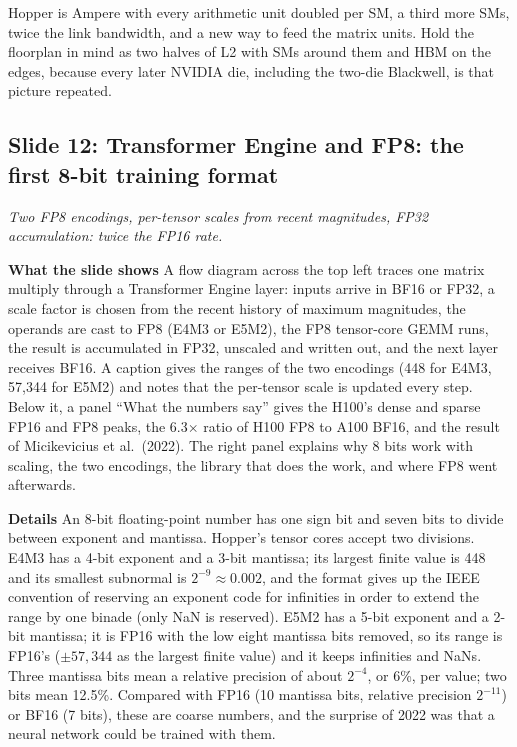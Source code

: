 \documentclass[11pt,letterpaper]{article}
\newcommand{\slide}[3]{%
  \subsection[Slide #1: #2]{Slide #1: #2}%
  {\color{muted}\itshape #3\par}\medskip}
\newcommand{\para}[1]{\medskip\noindent\textbf{#1}\quad}
\newenvironment{intuition}{\begin{tcolorbox}[intuitionbox]}{\end{tcolorbox}}
\begin{document}
\begin{intuition}
Hopper is Ampere with every arithmetic unit doubled per SM, a third more SMs, twice the link bandwidth, and a new way to feed the matrix units. Hold the floorplan in mind as two halves of L2 with SMs around them and HBM on the edges, because every later NVIDIA die, including the two-die Blackwell, is that picture repeated.
\end{intuition}

\slide{12}{Transformer Engine and FP8: the first 8-bit training format}{Two FP8 encodings, per-tensor scales from recent magnitudes, FP32 accumulation: twice the FP16 rate.}

\para{What the slide shows} A flow diagram across the top left traces one matrix multiply through a Transformer Engine layer: inputs arrive in BF16 or FP32, a scale factor is chosen from the recent history of maximum magnitudes, the operands are cast to FP8 (E4M3 or E5M2), the FP8 tensor-core GEMM runs, the result is accumulated in FP32, unscaled and written out, and the next layer receives BF16. A caption gives the ranges of the two encodings (448 for E4M3, 57{,}344 for E5M2) and notes that the per-tensor scale is updated every step. Below it, a panel ``What the numbers say'' gives the H100's dense and sparse FP16 and FP8 peaks, the 6.3$\times$ ratio of H100 FP8 to A100 BF16, and the result of Micikevicius et al.\ (2022). The right panel explains why 8 bits work with scaling, the two encodings, the library that does the work, and where FP8 went afterwards.

\para{Details} An 8-bit floating-point number has one sign bit and seven bits to divide between exponent and mantissa. Hopper's tensor cores accept two divisions. E4M3 has a 4-bit exponent and a 3-bit mantissa; its largest finite value is 448 and its smallest subnormal is $2^{-9}\approx 0.002$, and the format gives up the IEEE convention of reserving an exponent code for infinities in order to extend the range by one binade (only NaN is reserved). E5M2 has a 5-bit exponent and a 2-bit mantissa; it is FP16 with the low eight mantissa bits removed, so its range is FP16's ($\pm 57{,}344$ as the largest finite value) and it keeps infinities and NaNs. Three mantissa bits mean a relative precision of about $2^{-4}$, or 6\%, per value; two bits mean 12.5\%. Compared with FP16 (10 mantissa bits, relative precision $2^{-11}$) or BF16 (7 bits), these are coarse numbers, and the surprise of 2022 was that a neural network could be trained with them.
\end{document}
